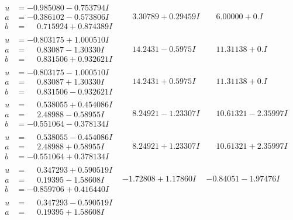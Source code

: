 \documentclass[1p]{elsarticle_modified}
\theoremstyle{definition}
\begin{document}
$$\begin{array}{c|c|c}
\begin{aligned}
u &= -0.985080 - 0.753794 I \\
a &= -0.386102 - 0.573806 I \\
b &= \phantom{-}0.715924 + 0.874389 I\end{aligned}
 & \phantom{-}3.30789 + 0.29459 I & \phantom{-}6.00000 + 0. I\phantom{ +0.000000I} \\ \hline\begin{aligned}
u &= -0.803175 + 1.000510 I \\
a &= \phantom{-}0.83087 - 1.30330 I \\
b &= \phantom{-}0.831506 + 0.932621 I\end{aligned}
 & \phantom{-}14.2431 - 0.5975 I & \phantom{-}11.31138 + 0. I\phantom{ +0.000000I} \\ \hline\begin{aligned}
u &= -0.803175 - 1.000510 I \\
a &= \phantom{-}0.83087 + 1.30330 I \\
b &= \phantom{-}0.831506 - 0.932621 I\end{aligned}
 & \phantom{-}14.2431 + 0.5975 I & \phantom{-}11.31138 + 0. I\phantom{ +0.000000I} \\ \hline\begin{aligned}
u &= \phantom{-}0.538055 + 0.454086 I \\
a &= \phantom{-}2.48988 - 0.58955 I \\
b &= -0.551064 - 0.378134 I\end{aligned}
 & \phantom{-}8.24921 - 1.23307 I & \phantom{-}10.61321 - 2.35997 I \\ \hline\begin{aligned}
u &= \phantom{-}0.538055 - 0.454086 I \\
a &= \phantom{-}2.48988 + 0.58955 I \\
b &= -0.551064 + 0.378134 I\end{aligned}
 & \phantom{-}8.24921 + 1.23307 I & \phantom{-}10.61321 + 2.35997 I \\ \hline\begin{aligned}
u &= \phantom{-}0.347293 + 0.590519 I \\
a &= \phantom{-}0.19395 - 1.58608 I \\
b &= -0.859706 + 0.416440 I\end{aligned}
 & -1.72808 + 1.17860 I & -0.84051 - 1.97476 I \\ \hline\begin{aligned}
u &= \phantom{-}0.347293 - 0.590519 I \\
a &= \phantom{-}0.19395 + 1.58608 I \\

\end{aligned}
\end{array}$$
\end{document}
